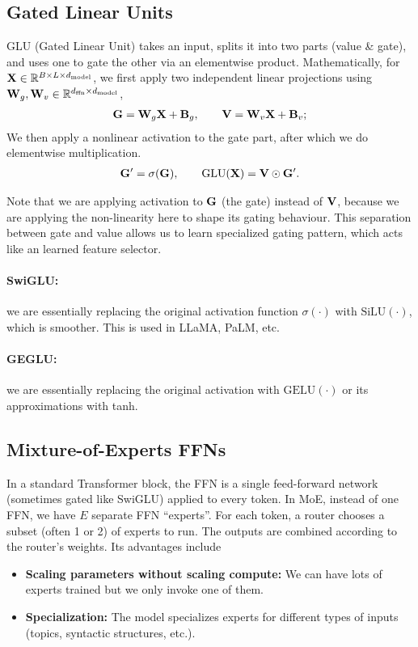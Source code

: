 \documentclass[11pt]{article}  %
\begin{document}
\subsection{Gated Linear Units}
GLU (Gated Linear Unit) takes an input, splits it into two parts (value \& gate), and uses one to gate the other via an elementwise product.
Mathematically, for $\mathbf{X} \in \mathbb{R}^{B \times L \times d_{\text{model}}}$, we first apply two independent linear projections using $\mathbf{W}_g, \mathbf{W}_v \in \mathbb{R}^{d_{\text{ffn}} \times d_{\text{model}}}$, 
\begin{align*}
  \mathbf{G} = \mathbf{W}_g \mathbf{X} + \mathbf{B}_g, \qquad \mathbf{V} = \mathbf{W}_v \mathbf{X} + \mathbf{B}_v;
\end{align*}
We then apply a nonlinear activation to the gate part, after which we do elementwise multiplication.
\begin{align*}
  \mathbf{G}^\prime = \sigma(\mathbf{G}), \qquad \text{GLU}(\mathbf{X}) = \mathbf{V} \odot \mathbf{G}^\prime.
\end{align*}

Note that we are applying activation to $\mathbf{G}$ (the gate) instead of $\mathbf{V}$, because we are applying the non-linearity here to shape its gating behaviour.
This separation between gate and value allows us to learn specialized gating pattern, which acts like an learned feature selector.

\paragraph{SwiGLU:} we are essentially replacing the original activation function $\sigma(\cdot)$ with $\text{SiLU}(\cdot)$, which is smoother. 
This is used in LLaMA, PaLM, etc.

\paragraph{GEGLU:} we are essentially replacing the original activation with $\text{GELU}(\cdot)$ or its approximations with tanh.


\subsection{Mixture-of-Experts FFNs}
In a standard Transformer block, the FFN is a single feed-forward network (sometimes gated like SwiGLU) applied to every token. 
In MoE, instead of one FFN, we have $E$ separate FFN ``experts''. 
For each token, a router chooses a subset (often 1 or 2) of experts to run.
The outputs are combined according to the router's weights.
Its advantages include 
\begin{itemize}
  \item \textbf{Scaling parameters without scaling compute:} We can have lots of experts trained but we only invoke one of them. 
  \item \textbf{Specialization:} The model specializes experts for different types of inputs (topics, syntactic structures, etc.).
\end{itemize}
\end{document}
